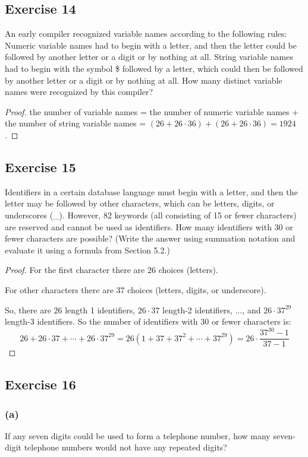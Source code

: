 \documentclass[14pt]{extarticle}
\begin{document}
\subsection{Exercise 14}
An early compiler recognized variable names according to the following rules: Numeric variable names had to begin 
with a letter, and then the letter could be followed by another letter or a digit or by nothing at all. String 
variable names had to begin with the symbol \$ followed by a letter, which could then be followed by another letter or 
a digit or by nothing at all. How many distinct variable names were recognized by this compiler?

\begin{proof}
the number of variable names = the number of numeric variable names + the number of string variable names = 
\((26 + 26 \cdot 36) + (26 + 26 \cdot 36) = 1924\).
\end{proof}

\subsection{Exercise 15}
Identifiers in a certain database language must begin with a letter, and then the letter may be followed by other 
characters, which can be letters, digits, or underscores (\_). However, 82 keywords (all consisting of 15 or fewer 
characters) are reserved and cannot be used as identifiers. How many identifiers with 30 or fewer characters are 
possible? (Write the answer using summation notation and evaluate it using a formula from Section 5.2.)

\begin{proof}
For the first character there are 26 choices (letters).

For other characters there are 37 choices (letters, digits, or underscore).

So, there are \(26\) length 1 identifiers, \(26 \cdot 37\) length-2 identifiers, ..., and \(26 \cdot 37^{29}\) 
length-3 identifiers. So the number of identifiers with 30 or fewer characters is:
\[
26+26 \cdot 37 + \cdots + 26 \cdot 37^{29} = 26(1+37+37^2+\cdots+37^{29}) = 26 \cdot \frac{37^{30}-1}{37-1}
\]
\end{proof}

\subsection{Exercise 16}
\subsubsection{(a)}
If any seven digits could be used to form a telephone number, how many seven-digit telephone numbers would not 
have any repeated digits?
\end{document}
